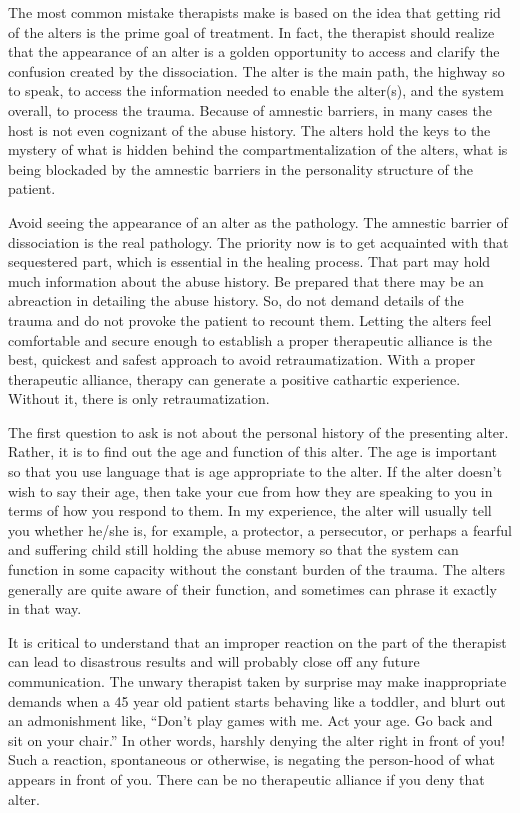 \documentclass[]{book}
\begin{document}
The most common mistake therapists make is based on the idea that getting rid of the alters is the prime goal of treatment. In fact, the therapist should realize that the appearance of an alter is a golden opportunity to access and clarify the confusion created by the dissociation. The alter is the main path, the highway so to speak, to access the information needed to enable the alter(s), and the system overall, to process the trauma. Because of amnestic barriers, in many cases the host is not even cognizant of the abuse history. The alters hold the keys to the mystery of what is hidden behind the compartmentalization of the alters, what is being blockaded by the amnestic barriers in the personality structure of the patient.

Avoid seeing the appearance of an alter as the pathology. The amnestic barrier of dissociation is the real pathology. The priority now is to get acquainted with that sequestered part, which is essential in the healing process. That part may hold much information about the abuse history. Be prepared that there may be an abreaction in detailing the abuse history. So, do not demand details of the trauma and do not provoke the patient to recount them. Letting the alters feel comfortable and secure enough to establish a proper therapeutic alliance is the best, quickest and safest approach to avoid retraumatization. With a proper therapeutic alliance, therapy can generate a positive cathartic experience. Without it, there is only retraumatization.

The first question to ask is not about the personal history of the presenting alter. Rather, it is to find out the age and function of this alter. The age is important so that you use language that is age appropriate to the alter. If the alter doesn't wish to say their age, then take your cue from how they are speaking to you in terms of how you respond to them. In my experience, the alter will usually tell you whether he/she is, for example, a protector, a persecutor, or perhaps a fearful and suffering child still holding the abuse memory so that the system can function in some capacity without the constant burden of the trauma. The alters generally are quite aware of their function, and sometimes can phrase it exactly in that way.

It is critical to understand that an improper reaction on the part of the therapist can lead to disastrous results and will probably close off any future communication. The unwary therapist taken by surprise may make inappropriate demands when a 45 year old patient starts behaving like a toddler, and blurt out an admonishment like, ``Don't play games with me. Act your age. Go back and sit on your chair.'' In other words, harshly denying the alter right in front of you! Such a reaction, spontaneous or otherwise, is negating the person-hood of what appears in front of you. There can be no therapeutic alliance if you deny that alter.
\end{document}
